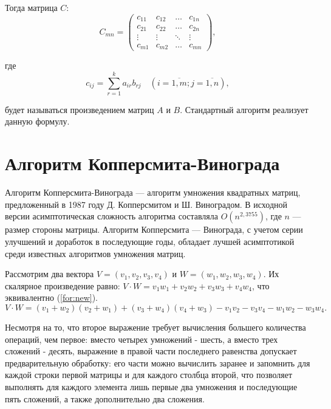 \documentclass[a4paper,14pt, unknownkeysallowed]{extreport}
\begin{document}
Тогда матрица $C$:
\begin{equation}
	C_{mn} = \begin{pmatrix}
		c_{11} & c_{12} & \ldots & c_{1n}\\
		c_{21} & c_{22} & \ldots & c_{2n}\\
		\vdots & \vdots & \ddots & \vdots\\
		c_{m1} & c_{m2} & \ldots & c_{mn}
	\end{pmatrix},
\end{equation}

где
\begin{equation}
	\label{eq:M}
	c_{ij} =
	\sum_{r=1}^{k} a_{ir}b_{rj} \quad (i=\overline{1,m}; j=\overline{1,n}),
\end{equation}

будет называться произведением матриц $A$ и $B$. Стандартный алгоритм реализует данную формулу.


\section{Алгоритм Копперсмита-Винограда}

Алгоритм Копперсмита-Винограда — алгоритм умножения квадратных матриц, предложенный в 1987 году Д. Копперсмитом и Ш. Виноградом.
В исходной версии асимптотическая сложность алгоритма составляла $O(n^{2,3755})$, где  $n$ — размер стороны матрицы.
Алгоритм Копперсмита — Винограда, с учетом серии улучшений и доработок в последующие годы, обладает лучшей асимптотикой среди известных алгоритмов умножения матриц.

Рассмотрим два вектора $V = (v_1, v_2, v_3, v_4)$ и $W = (w_1, w_2, w_3, w_4)$.
Их скалярное произведение равно: $V \cdot W = v_1w_1 + v_2w_2 + v_3w_3 + v_4w_4$, что эквивалентно (\ref{for:new}).
\begin{equation}
	\label{for:new}
	V \cdot W = (v_1 + w_2)(v_2 + w_1) + (v_3 + w_4)(v_4 + w_3) - v_1v_2 - v_3v_4 - w_1w_2 - w_3w_4.
\end{equation}

Несмотря на то, что второе выражение требует вычисления большего количества операций, чем первое: вместо четырех умножений - шесть, а вместо трех сложений - десять, выражение в правой части последнего равенства допускает предварительную обработку: его части можно вычислить заранее и запомнить для каждой строки первой матрицы и для каждого столбца второй, что позволяет выполнять для каждого элемента лишь первые два умножения и последующие пять сложений, а также дополнительно два сложения.
\end{document}
